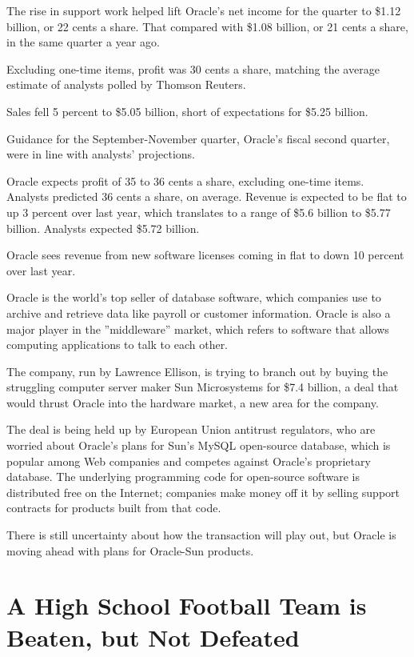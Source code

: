 ﻿\documentclass[12pt]{article}
\begin{document}
The rise in support work helped lift Oracle's net income for the quarter to \$1.12 billion, or 22
cents a share. That compared with \$1.08 billion, or 21 cents a share, in the same quarter a year
ago.

Excluding one-time items, profit was 30 cents a share, matching the average estimate of analysts
polled by Thomson Reuters.

Sales fell 5 percent to \$5.05 billion, short of expectations for \$5.25 billion.

Guidance for the September-November quarter, Oracle's fiscal second quarter, were in line with
analysts' projections.

Oracle expects profit of 35 to 36 cents a share, excluding one-time items. Analysts predicted 36
cents a share, on average. Revenue is expected to be flat to up 3 percent over last year, which
translates to a range of \$5.6 billion to \$5.77 billion. Analysts expected \$5.72 billion.

Oracle sees revenue from new software licenses coming in flat to down 10 percent over last year.

Oracle is the world's top seller of database software, which companies use to archive and retrieve
data like payroll or customer information. Oracle is also a major player in the ''middleware''
market, which refers to software that allows computing applications to talk to each other.

The company, run by Lawrence Ellison, is trying to branch out by buying the struggling computer
server maker Sun Microsystems for \$7.4 billion, a deal that would thrust Oracle into the hardware
market, a new area for the company.

The deal is being held up by European Union antitrust regulators, who are worried about Oracle's
plans for Sun's MySQL open-source database, which is popular among Web companies and competes
against Oracle's proprietary database. The underlying programming code for open-source software is
distributed free on the Internet; companies make money off it by selling support contracts for
products built from that code.

There is still uncertainty about how the transaction will play out, but Oracle is moving ahead with
plans for Oracle-Sun products.

\section{A High School Football Team is Beaten, but Not Defeated}
\end{document}
